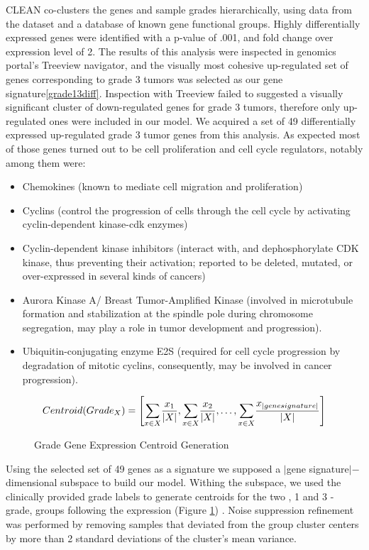\documentclass[a4paper,10pt]{article}
\begin{document}
CLEAN co-clusters
the genes and sample grades hierarchically, using data from the dataset and a database of known gene functional groups. Highly differentially
expressed genes were identified with a p-value of .001, and fold change over expression level of 2. The results of this analysis
were inspected in genomics portal's Treeview navigator\cite{Treeview}, and the visually most cohesive up-regulated set of genes
corresponding to grade 3 tumors was selected as our gene signature\ref{grade13diff}. 
Inspection with Treeview failed to suggested a 
visually significant cluster of down-regulated genes for grade 3 tumors, therefore only up-regulated ones were included in our model. 
We acquired a set of 49 differentially expressed up-regulated grade 3 tumor genes from this analysis.
As expected most of those genes turned out to be cell proliferation and cell cycle regulators, notably among them were:
\begin{itemize}
\item Chemokines (known to mediate cell migration and proliferation)
\item Cyclins (control the progression of cells through the cell cycle by activating cyclin-dependent kinase-cdk enzymes)
\item Cyclin-dependent kinase inhibitors  (interact with, and dephosphorylate CDK kinase,  thus preventing their activation; reported to be deleted, mutated, or over-expressed in several kinds of cancers)
\item Aurora Kinase A/ Breast Tumor-Amplified Kinase (involved in microtubule formation and stabilization at the spindle pole during chromosome segregation, may play a role  in tumor development and progression).
\item Ubiquitin-conjugating enzyme E2S (required for cell cycle progression by degradation of mitotic cyclins, consequently, may be involved in cancer progression).
\end{itemize}

\begin{figure}
$$
Centroid(Grade_X)= \left[              \underset{x\in X}     \sum{  { {x_1}    \over {| X |} } }   ,   
 \underset{x\in X}     \sum{  { {x_2}    \over {| X |} } },
\ldots ,
 \underset{x\in X}     \sum{  { {x_{| gene signature |}}    \over {| X |} } }                 \right] 
$$
\caption{Grade Gene Expression Centroid Generation}\label{centroid}
\end{figure}
Using the selected set of 49 genes as a signature we supposed a $|$gene signature$|-$dimensional subspace to build our model.
Withing the subspace, we used the clinically provided grade labels to generate centroids for the two , 1 and 3 - grade, groups following
the expression (Figure \ref{centroid}) . Noise suppression refinement was performed by removing samples that deviated from the group cluster
centers by more than 2 standard deviations of the cluster's mean variance.\\
\end{document}
